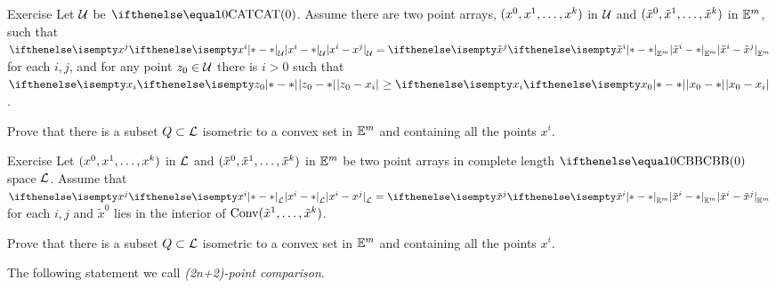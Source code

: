 \begin{thm}{Exercise}\label{ex:flat-in-CAT}
Let $\mathcal{U}$ be $\CAT0$. 
Assume there are two point arrays, $(x^0,x^1,\dots,x^\kay)$ in $\mathcal{U}$ and $(\tilde x^0,\tilde x^1,\dots,\tilde x^\kay)$ in $\mathbb{E}^m$, such that 
$\dist{x^i}{x^j}{\spc{U}}=\dist{\tilde x^i}{\tilde x^j}{\EE^m}$ for each $i,j$, and 
for any point $z_0\in\spc{U}$ there is $i>0$ such that $\dist{z_0}{x_i}{}\ge\dist{x_0}{x_i}{}$.

Prove that there is a subset $Q\subset\spc{L}$ isometric to a convex set in $\mathbb{E}^m$ and containing all the points $x^i$.
\end{thm}

\begin{thm}{Exercise}\label{ex:flat-in-CBB}
Let
$(x^0,x^1,\dots,x^\kay)$ in $\mathcal{L}$ and $(\tilde x^0,\tilde x^1,\dots,\tilde x^\kay)$ in $\mathbb{E}^m$
be two point arrays in complete length $\Alex{0}$ space $\mathcal{L}$.
Assume that 
$\dist{x^i}{x^j}{\spc{L}}=\dist{\tilde x^i}{\tilde x^j}{\EE^m}$ for each $i,j$
and
$\tilde x^0$ lies in the interior of $\Conv(\tilde x^1,\dots,\tilde x^\kay)$.

Prove that there is a subset $Q\subset\spc{L}$ isometric to a convex set in $\mathbb{E}^m$ and containing all the points $x^i$.
\end{thm}


The following statement we call \emph{(2\textit{n}+2)-point comparison}.


